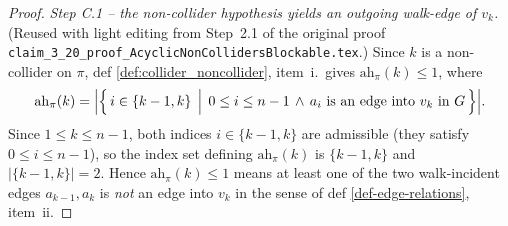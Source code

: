 \documentclass[main]{subfiles}
\begin{document}
\begin{proof}
\smallskip\noindent\emph{Step C.1 -- the non-collider hypothesis yields an outgoing walk-edge of $v_k$.}
(Reused with light editing from Step~2.1 of the original proof
\texttt{claim\_3\_20\_proof\_AcyclicNonCollidersBlockable.tex}.) Since $k$ is a non-collider on $\pi$, def \ref{def:collider_noncollider}, item~i.\ gives $\mathrm{ah}_\pi(k) \le 1$, where
\[
    \mathrm{ah}_\pi(k) = \Bigl|\Bigl\{\, i \in \{k - 1, k\} \,\Bigm|\, 0 \le i \le n - 1 \,\land\, a_i \text{ is an edge into } v_k \text{ in } G \,\Bigr\}\Bigr|.
\]
Since $1 \le k \le n - 1$, both indices $i \in \{k - 1, k\}$ are admissible (they satisfy $0 \le i \le n - 1$), so the index set defining $\mathrm{ah}_\pi(k)$ is $\{k - 1, k\}$ and $|\{k - 1, k\}| = 2$. Hence $\mathrm{ah}_\pi(k) \le 1$ means at least one of the two walk-incident edges $a_{k - 1}, a_k$ is \emph{not} an edge into $v_k$ in the sense of def \ref{def-edge-relations}, item~ii.


\end{proof}
\end{document}
